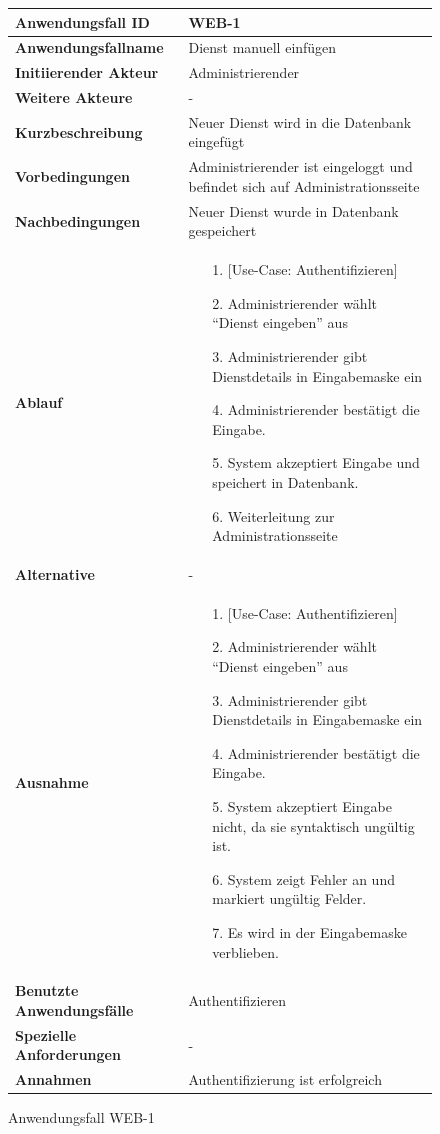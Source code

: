 \begin{figure}[h]
	\centering
	\begin{tabularx}{\textwidth}{ X | X }
		\textbf{Anwendungsfall ID} & WEB-1 \\ \hline
		\textbf{Anwendungsfallname} & Dienst manuell einfügen \\ \hline
		\textbf{Initiierender Akteur} & Administrierender \\ \hline
		\textbf{Weitere Akteure} & - \\ \hline
		\textbf{Kurzbeschreibung} & Neuer Dienst wird in die Datenbank eingefügt \\ \hline
		\textbf{Vorbedingungen} & Administrierender ist eingeloggt und befindet sich auf Administrationsseite \\ \hline
		\textbf{Nachbedingungen} & Neuer Dienst wurde in Datenbank gespeichert \\ \hline
		\textbf{Ablauf} &
		\begin{enumerate}
			\item [1.] [Use-Case: Authentifizieren]
			\item [2.] Administrierender wählt ``Dienst eingeben'' aus
			\item [3.] Administrierender gibt Dienstdetails in Eingabemaske ein
			\item [4.] Administrierender bestätigt die Eingabe.
			\item [5.] System akzeptiert Eingabe und speichert in Datenbank.
			\item [6.] Weiterleitung zur Administrationsseite
		\end{enumerate} \\ \hline
		\textbf{Alternative} & - \\ \hline
		\textbf{Ausnahme} &
		\begin{enumerate}
			\item [1.] [Use-Case: Authentifizieren]
			\item [2.] Administrierender wählt ``Dienst eingeben'' aus
			\item [3.] Administrierender gibt Dienstdetails in Eingabemaske ein
			\item [4.] Administrierender bestätigt die Eingabe.
			\item [5.] System akzeptiert Eingabe nicht, da sie syntaktisch ungültig ist.
			\item [6.] System zeigt Fehler an und markiert ungültig Felder.
			\item [7.] Es wird in der Eingabemaske verblieben.
		\end{enumerate} \\ \hline
		\textbf{Benutzte Anwendungsfälle} & Authentifizieren \\ \hline
		\textbf{Spezielle Anforderungen} & - \\ \hline
		\textbf{Annahmen} & Authentifizierung ist erfolgreich
	\end{tabularx}
	\caption{Anwendungsfall WEB-1}
	\label{fig:anwendungsfall-server-tabelle-web-1}
\end{figure}

